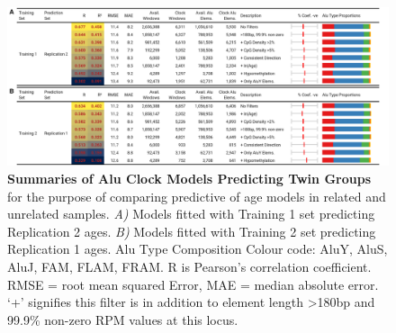 \documentclass[
]{book}
\begin{document}
\begin{figure}

{\centering \includegraphics[width=1\linewidth]{./figs/model_summary_tabs_ctrl} 

}

\caption{\textbf{Summaries of Alu Clock Models Predicting Twin Groups} for the purpose of comparing predictive of age models in related and unrelated samples. \emph{A)} Models fitted with Training 1 set predicting Replication 2 ages. \emph{B)} Models fitted with Training 2 set predicting Replication 1 ages. Alu Type Composition Colour code: \textcolor[HTML]{e41a1c}{AluY}, \textcolor[HTML]{377eb8}{AluS}, \textcolor[HTML]{4daf4a}{AluJ}, \textcolor[HTML]{984ea3}{FAM}, \textcolor[HTML]{ff7f00}{FLAM}, \textcolor[HTML]{ffff33}{FRAM}. R is Pearson's correlation coefficient. RMSE = root mean squared Error, MAE = median absolute error. `+' signifies this filter is in addition to element length \textgreater180bp and 99.9\% non-zero RPM values at this locus.}\label{fig:modelSummaryTabsCtrl}
\end{figure}
\end{document}
